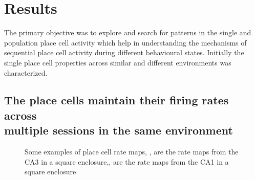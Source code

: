 \chapter{Results}
\label{results}

The primary objective was to explore and search for patterns in the single and population place cell activity which help in understanding the mechanisms of sequential place cell activity during different behavioural states. Initially the single place cell properties across similar and different environments was characterized.  \\

\section[Place cell firing in same environment]{The place cells maintain their firing rates across \\ multiple sessions in the same environment}


\begin{figure}[htb!]
\centering
{}
\label{fig:ratemaps}
\caption[Rate maps]{Some examples of place cell rate maps, ,  are the rate maps from the CA3 in a square enclosure,,  are the rate maps from the CA1 in a square enclosure}
\end{figure}


